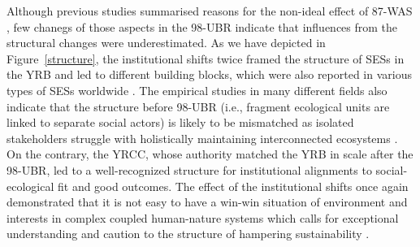 Although previous studies summarised reasons for the non-ideal effect of 87-WAS \cite{huangang2002}, few chanegs of those aspects in the 98-UBR indicate that influences from the structural changes were underestimated.
As we have depicted in Figure~\ref{structure}, the institutional shifts twice framed the structure of SESs in the YRB and led to different building blocks, which were also reported in various types of SESs worldwide \cite{kluger2020,guerrero2015,bodin2012}.
The empirical studies in many different fields also indicate that the structure before 98-UBR (i.e., fragment ecological units are linked to separate social actors) is likely to be mismatched as isolated stakeholders struggle with holistically maintaining interconnected ecosystems \cite{sayles2017,sayles2019,cai2016,bergsten2019}.
On the contrary, the YRCC, whose authority matched the YRB in scale after the 98-UBR, led to a well-recognized structure for institutional alignments to social-ecological fit and good outcomes.
The effect of the institutional shifts once again demonstrated that it is not easy to have a win-win situation of environment and interests in complex coupled human-nature systems \cite{hegwood2022} which calls for exceptional understanding and caution to the structure of hampering sustainability \cite{bergsten2019, sayles2019}.

